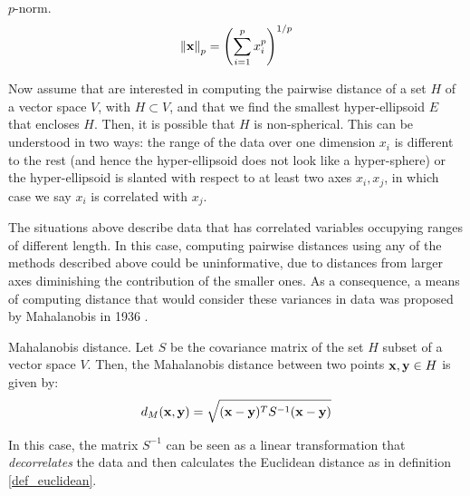 \documentclass[../main.tex]{subfiles}
\begin{document}
\begin{definition}{$p$-norm.} \label{def_pnorm}
\begin{align*}
\left\lVert\mathbf{x}\right\rVert_p = \left(\sum_{i=1}^px_i^p\right)^{1/p}
\end{align*}
\end{definition}
\par Now assume that are interested in computing the pairwise distance of a set $H$ of a vector space $V$, with $H \subset V$, and that we find the smallest hyper-ellipsoid $E$ that encloses $H$. Then, it is possible that $H$ is non-spherical. This can be understood in two ways: the range of the data over one dimension $x_i$ is different to the rest (and hence the hyper-ellipsoid does not look like a hyper-sphere) or the hyper-ellipsoid is slanted with respect to at least two axes $x_i, x_j$, in which case we say $x_i$ is correlated with $x_j$.
\par The situations above describe data that has correlated variables occupying ranges of different length. In this case, computing pairwise distances using any of the methods described above could be uninformative, due to distances from larger axes diminishing the contribution of the smaller ones. As a consequence, a means of computing distance that would consider these variances in data was proposed by Mahalanobis in 1936 \cite{Bellet2013}.

\begin{definition}{Mahalanobis distance.} \label{def_mahalanobis}
Let $S$ be the covariance matrix of the set $H$ subset of a vector space $V$. Then, the Mahalanobis distance between two points $\mathbf{x,y}\in H$ is given by:
\begin{align*}
d_{M}(\mathbf{x}, \mathbf{y}) = \sqrt{(\mathbf{x}-\mathbf{y})^TS^{-1}(\mathbf{x}-\mathbf{y})}
\end{align*}
\end{definition}

\par In this case, the matrix $S^{-1}$ can be seen as a linear transformation that \emph{decorrelates} the data and then calculates the Euclidean distance as in definition \ref{def_euclidean}. 
\end{document}
